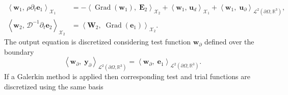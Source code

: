 \documentclass{svjour3}                     %
\DeclareMathOperator*{\Grad}{Grad}
\newcommand{\inner}[3][]{\ensuremath{\left\langle #2, \, #3 \right\rangle_{#1}}}
\newcommand{\firstRev}[1]{\textcolor{red!80!black}{#1}}
\begin{document}
	\firstRev{
		\begin{equation}
		\begin{aligned}
		\inner[\mathscr{X}_1]{\bm{w}_1}{\rho \partial_t \bm{e}_1} &=- \left\langle {\Grad} (\bm{w}_1), \; \bm{E}_2 \right\rangle_{\mathscr{X}_2} + \inner[\mathscr{X}_1]{\bm{w}_1}{\bm{u}_d}  + \left\langle \bm{w}_1, \; \bm{u}_\partial \right\rangle_{\mathscr{L}^2(\partial \Omega, \mathbb{R}^3)}, \\
		\inner[\mathscr{X}_2]{\bm{w}_2}{\bm{\mathcal{D}}^{-1}\partial_t \bm{e}_2} &=\left\langle \bm{W}_2, \; {\Grad} (\bm{e}_1) \right\rangle_{\mathscr{X}_2}.
		\end{aligned}
		\end{equation}
	}
	The output equation is discretized considering test function $\bm{w}_\partial$ defined over the boundary
	\begin{equation}
	\left\langle \bm{w}_\partial, \; \bm{y}_\partial \right\rangle_{\mathscr{L}^2(\partial \Omega, \mathbb{R}^3)} = \left\langle \bm{w}_\partial, \; \bm{e}_1 \right\rangle_{\mathscr{L}^2(\partial \Omega, \mathbb{R}^3)}.
	\end{equation}
	If a Galerkin method is applied then corresponding test and trial functions are discretized using the same basis
\end{document}
